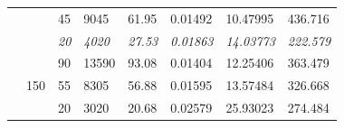 \documentclass[a4paper, 11pt]{report}
\begin{document}
\begin{table}[ht]
\begin{tabular}{|l|l|l|l|l|l|l|l|}
        \cline{3-8}
                                                                                &                                                                                 & 45                                                                     & 9045                                                                       & 61.95                                                                                            & 0.01492          & 10.47995          & 436.716                                                                       \\ 
        \cline{3-8}
                                                                                &                                                                                 & \textit{20}                                                            & \textit{4020}                                                              & \textit{27.53}                                                                                   & \textit{0.01863} & \textit{14.03773} & \textit{222.579}                                                              \\ 
        \cline{2-8}
                                                                                & \multirow{3}{*}{150}                                                            & 90                                                                     & 13590                                                                      & 93.08                                                                                            & 0.01404          & 12.25406          & 363.479                                                                       \\ 
        \cline{3-8}
                                                                                &                                                                                 & 55                                                                     & 8305                                                                       & 56.88                                                                                            & 0.01595          & 13.57484          & 326.668                                                                       \\ 
        \cline{3-8}
                                                                                &                                                                                 & 20                                                                     & 3020                                                                       & 20.68                                                                                            & 0.02579          & 25.93023          & 274.484                                                                       \\ 

\end{tabular}
\end{table}
\end{document}
